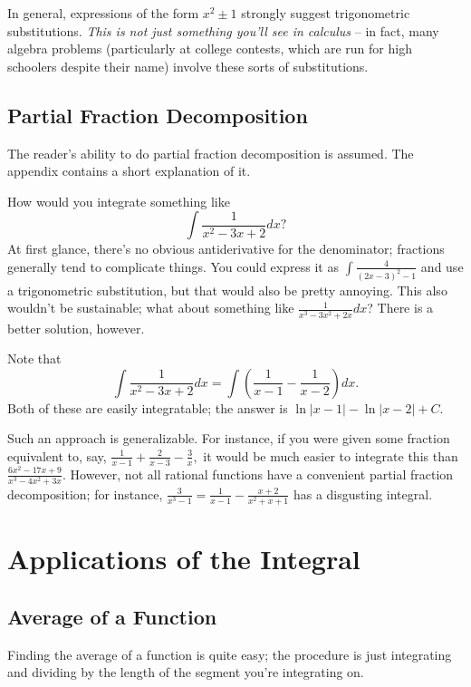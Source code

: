 \documentclass[mast]{lucky}
\begin{document}
In general, expressions of the form $x^2\pm 1$ strongly suggest trigonometric substitutions. \emph{This is not just something you'll see in calculus} -- in fact, many algebra problems (particularly at college contests, which are run for high schoolers despite their name) involve these sorts of substitutions.

\subsection{Partial Fraction Decomposition}

The reader's ability to do partial fraction decomposition is assumed. The appendix contains a short explanation of it.

How would you integrate something like
\[\int \frac{1}{x^2-3x+2}dx?\]
At first glance, there's no obvious antiderivative for the denominator; fractions generally tend to complicate things. You could express it as $\int \frac{4}{(2x-3)^2-1}$ and use a trigonometric substitution, but that would also be pretty annoying. This also wouldn't be sustainable; what about something like $\frac{1}{x^3-3x^2+2x}dx$? There is a better solution, however.

\begin{sol}
Note that \[\int\frac{1}{x^2-3x+2}dx=\int\left(\frac{1}{x-1}-\frac{1}{x-2}\right)dx.\] Both of these are easily integratable; the answer is $\ln |x-1|-\ln|x-2|+C.$
\end{sol}

Such an approach is generalizable. For instance, if you were given some fraction equivalent to, say, $\frac{1}{x-1}+\frac{2}{x-3}-\frac{3}{x},$ it would be much easier to integrate this than $\frac{6x^2-17x+9}{x^3-4x^2+3x}.$ However, not all rational functions have a convenient partial fraction decomposition; for instance, $\frac{3}{x^3-1}=\frac{1}{x-1}-\frac{x+2}{x^2+x+1}$ has a disgusting integral.

\section{Applications of the Integral}

\subsection{Average of a Function}

Finding the average of a function is quite easy; the procedure is just integrating and dividing by the length of the segment you're integrating on.
\end{document}
